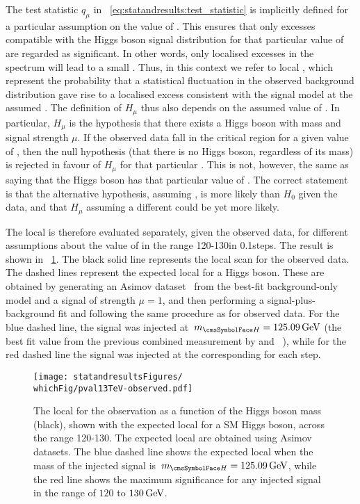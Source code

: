 The test statistic $q_{\mu}$ in \Eq~\ref{eq:statandresults:test_statistic} is implicitly defined for a particular assumption on the value of \mH. This ensures that only excesses compatible with the Higgs boson signal distribution for that particular value of \mH are regarded as significant. In other words, only localised excesses in the \mgg spectrum will lead to a small \pvalue. Thus, in this context we refer to local \pvalue\s, which represent the probability that a statistical fluctuation in the observed background distribution gave rise to a localised excess consistent with the signal model at the assumed \mH. The definition of $H_{\mu}$ thus also depends on the assumed value of \mH. In particular, $H_{\mu}$ is the hypothesis that there exists a Higgs boson with mass \mH and signal strength $\mu$. If the observed data fall in the critical region for a given value of \mH, then the null hypothesis (that there is no Higgs boson, regardless of its mass) is rejected in favour of $H_{\mu}$ for that particular \mH. This is not, however, the same as saying that the Higgs boson has that particular value of \mH. The correct statement is that the alternative hypothesis, assuming \mH, is more likely than $H_{0}$ given the data, and that $H_{\mu}$ assuming a different \mH could be yet more likely.

The local \pvalue is therefore evaluated separately, given the observed data, for different assumptions about the value of \mH in the range 120-130\GeV in 0.1\GeV steps. The result is shown in \Fig~\ref{fig:statandresults:pval}. The black solid line represents the local \pvalue scan for the observed data. The dashed lines represent the expected local \pvalue\s for a \SM Higgs boson. These are obtained by generating an Asimov dataset~\cite{Cowan:2010js} from the best-fit background-only model and a signal of strength $\mu=1$, and then performing a signal-plus-background fit and following the same procedure as for observed data. For the blue dashed line, the signal was injected at $\mH=125.09\GeV$ (the best fit value from the previous combined \RunI measurement by \CMS and \ATLAS~\cite{PhysRevLett.114.191803}), while for the red dashed line the signal was injected at the corresponding \mH for each step. 


\begin{figure}[ht!]
\centering
\texttt{[image: statandresultsFigures/\\whichFig/pval13TeV-observed.pdf]} 
\caption{The local \pvalue for the observation as a function of the Higgs boson mass (black), shown with the expected local \pvalue\s for a SM Higgs boson, across the range 120-130\GeV. The expected local \pvalue\s are obtained using Asimov datasets. The blue dashed line shows the expected local \pvalue when the mass of the injected signal is $\mH=125.09\GeV$, while the red line shows the maximum significance for any injected signal in the range of $120$ to $130\,\text{Ge\hspace{-.08em}V}$.}

\label{fig:statandresults:pval}
\end{figure}

